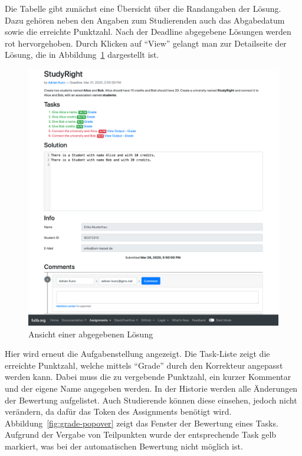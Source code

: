 Die Tabelle gibt zunächst eine Übersicht über die Randangaben der Lösung.
Dazu gehören neben den Angaben zum Studierenden auch das Abgabedatum sowie die erreichte Punktzahl.
Nach der Deadline abgegebene Lösungen werden rot hervorgehoben.
Durch Klicken auf ``View'' gelangt man zur Detailseite der Lösung, die in Abbildung~\ref{fig:solution} dargestellt ist.

\begin{figure}
    \centering
    \includegraphics[width=\textwidth]{chapter/fulib.org/img/solution.png}
    \caption{Ansicht einer abgegebenen Lösung}
    \label{fig:solution}
\end{figure}

Hier wird erneut die Aufgabenstellung angezeigt.
Die Task-Liste zeigt die erreichte Punktzahl, welche mittels ``Grade'' durch den Korrekteur angepasst werden kann.
Dabei muss die zu vergebende Punktzahl, ein kurzer Kommentar und der eigene Name angegeben werden.
In der Historie werden alle Änderungen der Bewertung aufgelistet.
Auch Studierende können diese einsehen, jedoch nicht verändern, da dafür das Token des Assignments benötigt wird.
Abbildung~\ref{fig:grade-popover} zeigt das Fenster der Bewertung eines Tasks.
Aufgrund der Vergabe von Teilpunkten wurde der entsprechende Task gelb markiert, was bei der automatischen Bewertung nicht möglich ist.

